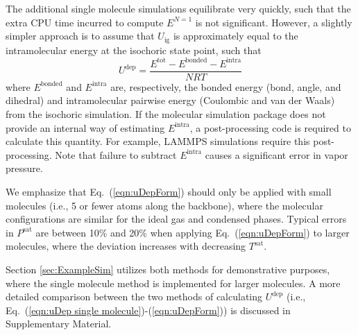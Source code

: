 \documentclass[5p,times]{elsarticle}
\begin{document}
The additional single molecule simulations equilibrate very quickly, such that the extra CPU time incurred to compute $E^{N=1}$ is not significant. However, a slightly simpler approach is to assume that $U_{\mathrm{ig}}$ is approximately equal to the intramolecular energy at the isochoric state point, such that
\begin{equation}
U^{\mathrm{dep}} = \frac{E^{\mathrm{tot}} - E^{\mathrm{bonded}} - E^{\mathrm{intra}}}{NRT}\label{eqn:uDepForm}
\end{equation}
where $E^{\mathrm{bonded}}$ and $E^{\mathrm{intra}}$ are, respectively, the bonded energy (bond, angle, and dihedral) and intramolecular pairwise energy (Coulombic and van der Waals) from the isochoric simulation. If the molecular simulation package does not provide an internal way of estimating $E^{\mathrm{intra}}$, a post-processing code is required to calculate this quantity. For example, LAMMPS simulations require this post-processing. Note that failure to subtract $E^{\mathrm{intra}}$ causes a significant error in vapor pressure.

We emphasize that Eq.~(\ref{eqn:uDepForm}) should only be applied with small molecules (i.e., 5 or fewer atoms along the backbone), where the molecular configurations are similar for the ideal gas and condensed phases. Typical errors in $P^{\mathrm{sat}}$ are between 10\% and 20\% when applying Eq.~(\ref{eqn:uDepForm}) to larger molecules, where the deviation increases with decreasing $T^{\mathrm{sat}}$.

Section \ref{sec:ExampleSim} utilizes both methods for demonstrative purposes, where the single molecule method is implemented for larger molecules. A more detailed comparison between the two methods of calculating $U^{\mathrm{dep}}$ (i.e., Eq.~(\ref{eqn:uDep single molecule})-(\ref{eqn:uDepForm})) is discussed in Supplementary Material.


\end{document}
